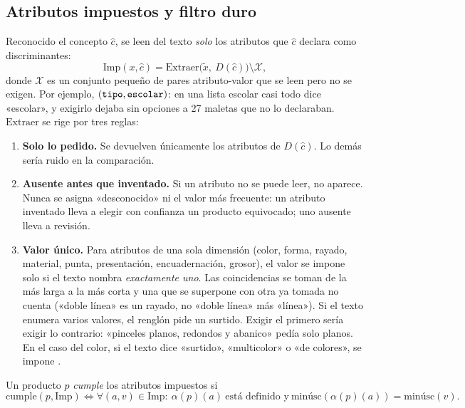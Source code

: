 \subsection{Atributos impuestos y filtro duro}
\label{sec:res-atributos}

Reconocido el concepto $\hat c$, se leen del texto \emph{solo} los atributos
que $\hat c$ declara como discriminantes:
\[
  \mathrm{Imp}(x,\hat c)=\mathrm{Extraer}\bigl(\tilde x,\ D(\hat c)\bigr)\setminus\mathcal{X},
\]
donde $\mathcal{X}$ es un conjunto pequeño de pares atributo-valor que se leen
pero no se exigen. Por ejemplo, $(\texttt{tipo},\texttt{escolar})$: en una lista
escolar casi todo dice «escolar», y exigirlo dejaba sin opciones a 27 maletas
que no lo declaraban. $\mathrm{Extraer}$ se rige por tres reglas:

\begin{enumerate}
  \item \textbf{Solo lo pedido.} Se devuelven únicamente los atributos de
        $D(\hat c)$. Lo demás sería ruido en la comparación.
  \item \textbf{Ausente antes que inventado.} Si un atributo no se puede leer,
        no aparece. Nunca se asigna «desconocido» ni el valor más frecuente:
        un atributo inventado lleva a elegir con confianza un producto
        equivocado; uno ausente lleva a revisión.
  \item \textbf{Valor único.} Para atributos de una sola dimensión (color,
        forma, rayado, material, punta, presentación, encuadernación, grosor),
        el valor se impone solo si el texto nombra \emph{exactamente uno}. Las
        coincidencias se toman de la más larga a la más corta y una que se
        superpone con otra ya tomada no cuenta («doble línea» es un rayado, no
        «doble línea» más «línea»). Si el texto enumera varios valores, el
        renglón pide un surtido. Exigir el primero sería exigir lo contrario:
        «pinceles planos, redondos y abanico» pedía solo planos. En el caso del
        color, si el texto dice «surtido», «multicolor» o «de colores», se
        impone .
\end{enumerate}

\begin{definicion}[Cumplimiento]
Un producto $p$ \emph{cumple} los atributos impuestos si
\[
  \mathrm{cumple}(p,\mathrm{Imp}) \iff
  \forall (a,v)\in\mathrm{Imp}:\ \alpha(p)(a)\ \text{está definido y}\
  \mathrm{minúsc}(\alpha(p)(a))=\mathrm{minúsc}(v).
\]
\end{definicion}

